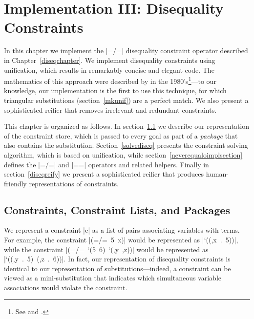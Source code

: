 \chapter{Implementation III:  Disequality Constraints}\label{diseqimplchapter}

In this chapter we implement the \mbox{\scheme|=/=|} disequality
constraint operator described in Chapter~\ref{diseqchapter}.  We
implement disequality constraints using unification, which results in
remarkably concise and elegant code.  The mathematics of this approach
were described by \citeauthor{Comon91disunification:a} in the
1980's\footnote{See \citet{Comon91disunification:a} and
\citet{ComonEquational1989}.}---to our knowledge, our implementation
is the first to use this technique, for which triangular
substitutions (section~\ref{mkunif}) are a perfect match.  We also
present a sophisticated reifier that removes irrelevant and redundant
constraints.

This chapter is organized as follows.  In section~\ref{diseqrep} we
describe our representation of the constraint store, which is passed
to every goal as part of a \emph{package} that also contains the
substitution.  Section~\ref{solvediseq} presents the constraint
solving algorithm, which is based on unification, while
section~\ref{neverequaloimplsection} defines the \scheme|=/=| and
\scheme|==| operators and related helpers.  Finally in
section~\ref{diseqreify} we present a sophisticated reifier that
produces human-friendly representations of constraints.

\section{Constraints, Constraint Lists, and Packages}\label{diseqrep}

We represent a constraint \scheme|c| as a list of pairs associating variables with terms.
For example, the constraint \mbox{\scheme|(=/= 5 x)|} would be represented as
\mbox{\scheme|`((,x . 5))|}, while the constraint \mbox{\scheme|(=/= `(5 6) `(,y ,z))|}
would be represented as \mbox{\scheme|`((,y . 5) (,z . 6))|}.  In fact, our representation
of disequality constraints is identical to our representation of substitutions---indeed, a
constraint can be viewed as a mini-substitution that indicates which simultaneous variable
associations would violate the constraint.


